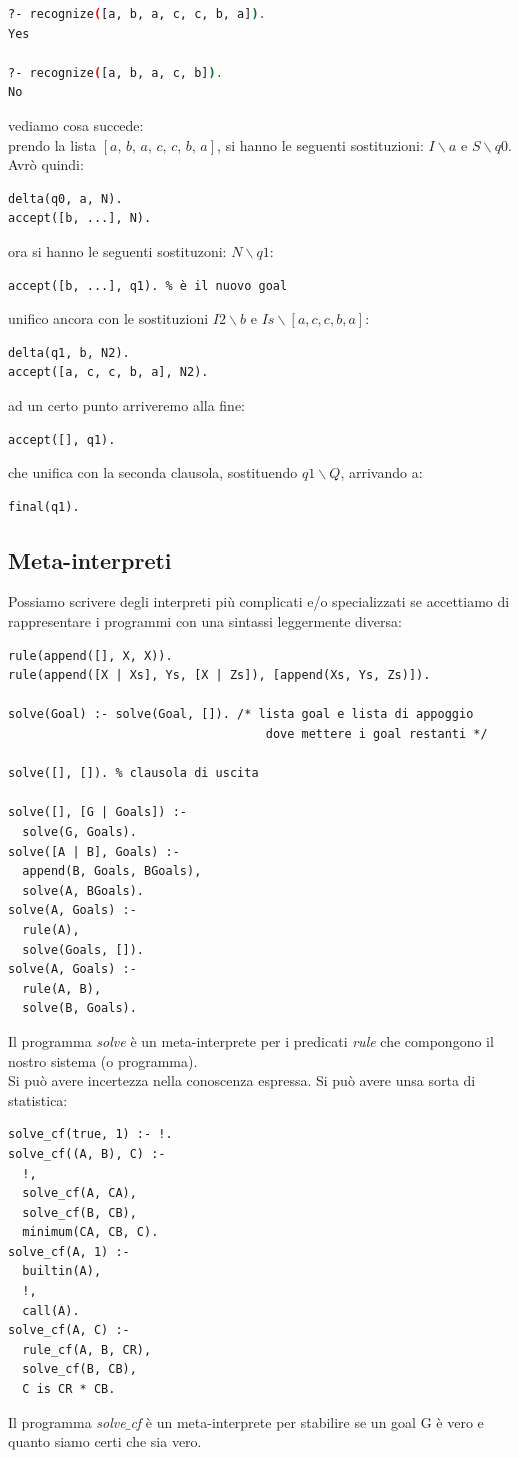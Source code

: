 \documentclass[a4paper,12pt, oneside]{book}
\begin{document}
\begin{shaded}
\begin{lstlisting}[language=bash]
?- recognize([a, b, a, c, c, b, a]).
Yes

?- recognize([a, b, a, c, b]).
No
\end{lstlisting}
\end{shaded}
vediamo cosa succede:\\
prendo la lista $[a,\,b,\,a,\,c,\,c,\,b,\,a]$, si hanno le seguenti sostituzioni: $I\backslash a$ e $S\backslash q0$. Avrò quindi:
\begin{verbatim}
delta(q0, a, N).
accept([b, ...], N).
\end{verbatim}
ora si hanno le seguenti sostituzoni: $N\backslash q1$:
\begin{verbatim}
accept([b, ...], q1). % è il nuovo goal
\end{verbatim}
\newpage
unifico ancora con le sostituzioni $I2\backslash b$ e $Is\backslash [a,c,c,b,a]$:
\begin{verbatim}
delta(q1, b, N2).
accept([a, c, c, b, a], N2).
\end{verbatim}
ad un certo punto arriveremo alla fine:
\begin{verbatim}
accept([], q1).
\end{verbatim}
che unifica con la seconda clausola, sostituendo $q1\backslash Q$, arrivando a:
\begin{verbatim}
final(q1).
\end{verbatim}
\subsection{Meta-interpreti}
Possiamo scrivere degli interpreti più complicati e/o specializzati
se accettiamo di rappresentare i programmi con una sintassi
leggermente diversa:
\begin{verbatim}
rule(append([], X, X)).
rule(append([X | Xs], Ys, [X | Zs]), [append(Xs, Ys, Zs)]).

solve(Goal) :- solve(Goal, []). /* lista goal e lista di appoggio 
                                    dove mettere i goal restanti */

solve([], []). % clausola di uscita

solve([], [G | Goals]) :-
  solve(G, Goals).
solve([A | B], Goals) :-
  append(B, Goals, BGoals),
  solve(A, BGoals).
solve(A, Goals) :-
  rule(A),
  solve(Goals, []).
solve(A, Goals) :-
  rule(A, B),
  solve(B, Goals).
\end{verbatim}
Il programma \textit{solve} è un meta-interprete per i predicati \textit{rule }che compongono il nostro sistema (o programma).\\
\newpage
Si può avere incertezza nella conoscenza espressa. Si può avere unsa sorta di statistica:
\begin{verbatim}
solve_cf(true, 1) :- !.
solve_cf((A, B), C) :-
  !,
  solve_cf(A, CA),
  solve_cf(B, CB),
  minimum(CA, CB, C).
solve_cf(A, 1) :-
  builtin(A),
  !,
  call(A).
solve_cf(A, C) :-
  rule_cf(A, B, CR),
  solve_cf(B, CB),
  C is CR * CB.
\end{verbatim}
Il programma \textit{solve}$\_$\textit{cf} è un meta-interprete per stabilire se un goal G è vero e quanto siamo certi che sia vero.
\end{document}
